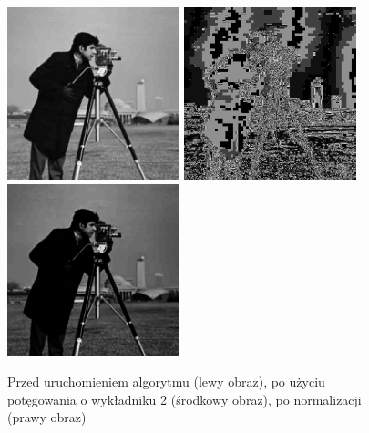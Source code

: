 \documentclass[a4paper,12pt]{book}
\begin{document}
\begin{figure}[H]
	\caption{Przed uruchomieniem algorytmu (lewy obraz), po użyciu potęgowania o wykładniku 2 (środkowy obraz), po normalizacji (prawy obraz)}
	\includegraphics[width=5cm, height=5cm]{man-unmodified.jpg}
	\includegraphics[width=5cm, height=5cm]{2-4/power-gray-photoman-20.png}
	\includegraphics[width=5cm, height=5cm]{2-4/power-gray-photoman-20-norm.png}
\end{figure}
\end{document}
